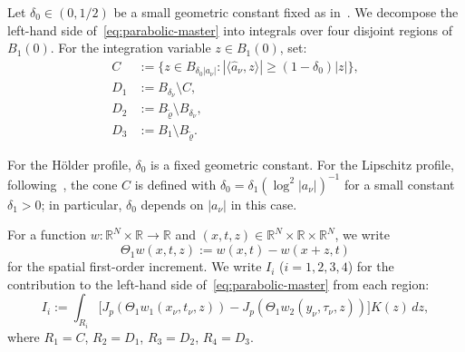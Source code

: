 \documentclass[11pt, a4paper, twoside]{article}
\theoremstyle{definition}
\theoremstyle{remark}
\newcommand{\R}{\mathbb{R}}
\begin{document}
Let $\delta_0 \in (0, 1/2)$ be a small geometric constant fixed as in~\cite{BiswasTopp2025}. We decompose the left-hand side of~\eqref{eq:parabolic-master} into integrals over four disjoint regions of $B_1(0)$. For the integration variable $z \in B_1(0)$, set:
\begin{align*}
  C &:= \{z \in B_{\delta_0 |a_\nu|} : |\langle \hat{a}_\nu, z \rangle| \ge (1-\delta_0)|z|\}, \\
  D_1 &:= B_{\delta_\nu} \setminus C, \\
  D_2 &:= B_{\tilde\varrho} \setminus B_{\delta_\nu}, \\
  D_3 &:= B_1 \setminus B_{\tilde\varrho}.
\end{align*}
\begin{remark}
For the Hölder profile, $\delta_0$ is a fixed geometric constant. For the Lipschitz profile, following~\cite[Lemma~2.2(ii)]{BiswasTopp2025}, the cone $C$ is defined with $\delta_0 = \delta_1(\log^2|a_\nu|)^{-1}$ for a small constant $\delta_1 > 0$; in particular, $\delta_0$ depends on $|a_\nu|$ in this case.
\end{remark}
For a function $w : \R^N \times \R \to \R$ and $(x,t,z) \in \R^N \times \R \times \R^N$, we write
\[
  \Theta_1 w(x,t,z) := w(x,t) - w(x+z,t)
\]
for the spatial first-order increment. We write $I_i$ ($i=1,2,3,4$) for the contribution to the left-hand side of~\eqref{eq:parabolic-master} from each region:
\[
  I_i := \int_{R_i} \bigl[J_p(\Theta_1 w_1(x_\nu,t_\nu,z)) - J_p(\Theta_1 w_2(y_\nu,\tau_\nu,z))\bigr] K(z)\,dz,
\]
where $R_1 = C$, $R_2 = D_1$, $R_3 = D_2$, $R_4 = D_3$.
\end{document}
